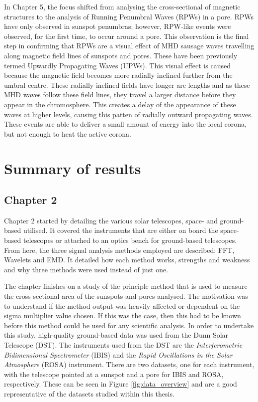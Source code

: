     In Chapter 5, the focus shifted from analysing the cross-sectional of magnetic structures to the analysis of Running Penumbral Waves (RPWs) in a pore.
    RPWs have only observed in sunspot penumbras; however, RPW-like events were observed, for the first time, to occur around a pore.
    This observation is the final step in confirming that RPWs are a visual effect of MHD sausage waves travelling along magnetic field lines of sunspots and pores.
    These have been previously termed Upwardly Propagating Waves (UPWs).
    This visual effect is caused because the magnetic field becomes more radially inclined further from the umbral centre.
    These radially inclined fields have longer arc lengths and as these MHD waves follow these field lines, they travel a larger distance before they appear in the chromosphere.
    This creates a delay of the appearance of these waves at higher levels, causing this patten of radially outward propagating waves.
    These events are able to deliver a small amount of energy into the local corona, but not enough to heat the active corona.
       
\section{Summary of results}

	\subsection{Chapter 2}

    Chapter 2 started by detailing the various solar telescopes, space- and ground-based utilised.
    It covered the instruments that are either on board the space-based telescopes or attached to an optics bench for ground-based telescopes.
    From here, the three signal analysis methods employed are described: FFT, Wavelets and EMD.
    It detailed how each method works, strengths and weakness and why three methods were used instead of just one.
    
    The chapter finishes on a study of the principle method that is used to measure the cross-sectional area of the sunspots and pores analysed.
    The motivation was to understand if the method output was heavily affected or dependent on the sigma multiplier value chosen.
    If this was the case, then this had to be known before this method could be used for any scientific analysis.    
    In order to undertake this study, high-quality ground-based data was used from the Dunn Solar Telescope (DST).
    The instruments used from the DST are the \textit{Interferometric Bidimensional Spectrometer} (IBIS) and the \textit{Rapid Oscillations in the Solar Atmosphere} (ROSA) instrument.
    There are two datasets, one for each instrument, with the telescope pointed at a sunspot and a pore for IBIS and ROSA, respectively.
    These can be seen in Figure \ref{fig:data_overview} and are a good representative of the datasets studied within this thesis.
    
